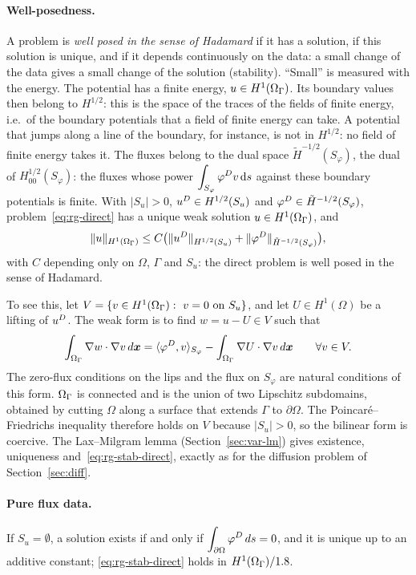 \paragraph{Well-posedness.}
%
A problem is \emph{well posed in the sense of Hadamard} if it has a
solution, if this solution is unique, and if it depends continuously on the
data: a small change of the data gives a small change of the solution
(stability). ``Small'' is measured with the energy. The potential has a
finite energy, $u\in H^1(\Omega_\Gamma)$. Its boundary values then belong to
$H^{1/2}$: this is the space of the traces of the fields of finite energy,
i.e.\ of the boundary potentials that a field of finite energy can take. A
potential that jumps along a line of the boundary, for instance, is not in
$H^{1/2}$: no field of finite energy takes it. The fluxes belong to the dual
space $\tilde H^{-1/2}(S_\varphi)$, the dual of $H^{1/2}_{00}(S_\varphi)$: the
fluxes whose power $\displaystyle \int_{S_\varphi}\varphi^{D} v\,\mathrm{d} s$ against these boundary
potentials is finite. With $|S_u|>0$, $u^{D}\in H^{1/2}(S_u)$ and
$\varphi^{D}\in\tilde H^{-1/2}(S_\varphi)$, problem~\eqref{eq:rg-direct} has a unique
weak solution $u\in H^1(\Omega_\Gamma)$, and
\begin{equation}\label{eq:rg-stab-direct}
\|u\|_{H^1(\Omega_\Gamma)}\le C\bigl(\|u^{D}\|_{H^{1/2}(S_u)}+\|\varphi^{D}\|_{\tilde H^{-1/2}(S_\varphi)}\bigr),
\end{equation}
with $C$ depending only on $\Omega$, $\Gamma$ and $S_u$: the direct problem is well posed in the sense of Hadamard.

To see this, let $V=\{v\in H^1(\OG):\ v=0\text{ on }S_u\}$, and let $U\in H^1(\Omega)$ be a lifting of $u^{D}$. The weak form is to find $w=u-U\in V$ such that
\[
\int_{\Omega_\Gamma}\nabla w\cdot\nabla v\,d\bm{x}=\langle\varphi^{D},v\rangle_{S_\varphi}-\int_{\Omega_\Gamma}\nabla U\cdot\nabla v\,d\bm{x}\qquad\forall v\in V .
\]
The zero-flux conditions on the lips and the flux on $S_\varphi$ are natural conditions of this form. $\Omega_\Gamma$ is connected and is the union of two Lipschitz subdomains, obtained by cutting $\Omega$ along a surface that extends $\Gamma$ to $\partial\Omega$. The Poincaré--Friedrichs inequality therefore holds on $V$ because $|S_u|>0$, so the bilinear form is coercive. The Lax--Milgram lemma (Section~\ref{sec:var-lm}) gives existence, uniqueness and~\eqref{eq:rg-stab-direct}, exactly as for the diffusion problem of Section~\ref{sec:diff}.

\paragraph{Pure flux data.} If $S_u=\emptyset$, a solution exists if and only if $\displaystyle \int_{\partial\Omega}\varphi^{D}\,ds=0$, and it is unique up to an additive constant; \eqref{eq:rg-stab-direct} holds in $H^1(\Omega_\Gamma)/1.8$.

